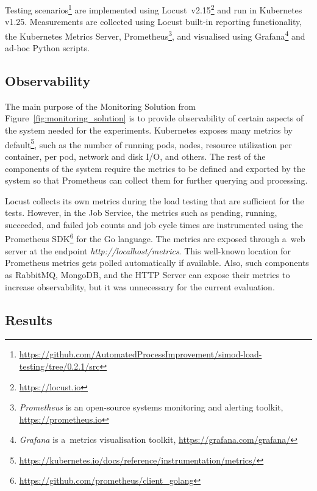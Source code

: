 \documentclass[12pt]{article}
\begin{document}
Testing scenarios\footnote{\href{https://github.com/AutomatedProcessImprovement/simod-load-testing/tree/0.2.1/src}{https://github.com/AutomatedProcessImprovement/simod-load-testing/tree/0.2.1/src}} are implemented using Locust~v2.15\footnote{\href{https://locust.io}{https://locust.io}} and run in Kubernetes v1.25. Measurements are collected using Locust built-in reporting functionality, the Kubernetes Metrics Server, Prometheus\footnote{\emph{Prometheus} is an open-source systems monitoring and alerting toolkit, \href{https://prometheus.io}{https://prometheus.io}}, and visualised using Grafana\footnote{\emph{Grafana} is a~metrics visualisation toolkit, \href{https://grafana.com/grafana/}{https://grafana.com/grafana/}} and ad-hoc Python scripts.

\subsection{Observability}

The main purpose of the Monitoring Solution from Figure~\ref{fig:monitoring_solution} is to provide observability of certain aspects of the system needed for the experiments. Kubernetes exposes many metrics by default\footnote{\href{https://kubernetes.io/docs/reference/instrumentation/metrics/}{https://kubernetes.io/docs/reference/instrumentation/metrics/}}, such as the number of running pods, nodes, resource utilization per container, per pod, network and disk I/O, and others. The rest of the components of the system require the metrics to be defined and exported by the system so that Prometheus can collect them for further querying and processing.

Locust collects its own metrics during the load testing that are sufficient for the tests. However, in the Job Service, the metrics such as pending, running, succeeded, and failed job counts and job cycle times are instrumented using the Prometheus SDK\footnote{\href{https://github.com/prometheus/client_golang}{https://github.com/prometheus/client\_golang}} for the Go language. The metrics are exposed through a~web server at the endpoint \emph{http://localhost/metrics}. This well-known location for Prometheus metrics gets polled automatically if available. Also, such components as RabbitMQ, MongoDB, and the HTTP Server can expose their metrics to increase observability, but it was unnecessary for the current evaluation.

\subsection{Results} \label{ch:results}
\end{document}
